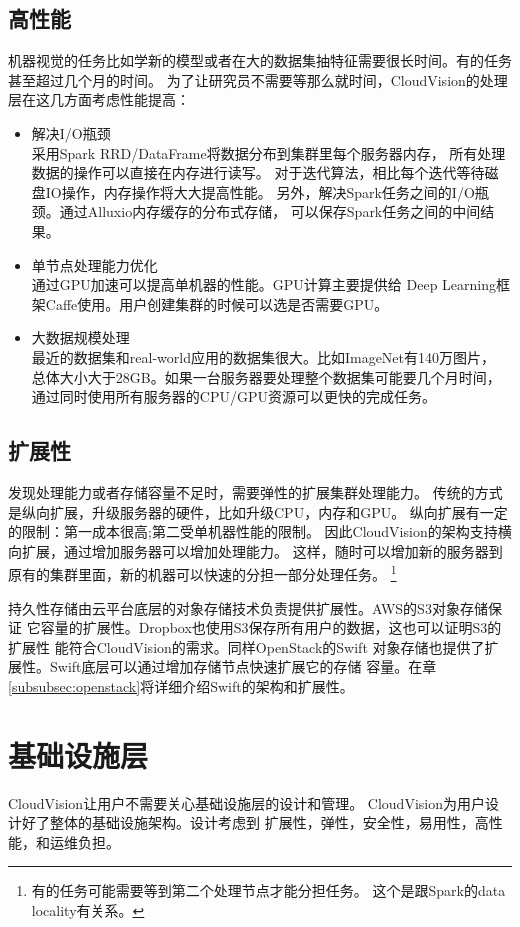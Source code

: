 \subsection{高性能}
机器视觉的任务比如学新的模型或者在大的数据集抽特征需要很长时间。有的任务甚至超过几个月的时间。
为了让研究员不需要等那么就时间，CloudVision的处理层在这几方面考虑性能提高：
\begin{itemize}
  \item 解决I/O瓶颈 \\
        采用Spark RRD/DataFrame将数据分布到集群里每个服务器内存，
        所有处理数据的操作可以直接在内存进行读写。
        对于迭代算法，相比每个迭代等待磁盘IO操作，内存操作将大大提高性能。
        另外，解决Spark任务之间的I/O瓶颈。通过Alluxio内存缓存的分布式存储，
        可以保存Spark任务之间的中间结果。
  \item 单节点处理能力优化 \\
        通过GPU加速可以提高单机器的性能。GPU计算主要提供给
        Deep Learning框架Caffe使用。用户创建集群的时候可以选是否需要GPU。
  \item 大数据规模处理 \\
        最近的数据集和real-world应用的数据集很大。比如ImageNet有140万图片，
        总体大小大于28GB。如果一台服务器要处理整个数据集可能要几个月时间，
        通过同时使用所有服务器的CPU/GPU资源可以更快的完成任务。
\end{itemize}

\subsection{扩展性}
发现处理能力或者存储容量不足时，需要弹性的扩展集群处理能力。
传统的方式是纵向扩展，升级服务器的硬件，比如升级CPU，内存和GPU。
纵向扩展有一定的限制：第一成本很高;第二受单机器性能的限制。
因此CloudVision的架构支持横向扩展，通过增加服务器可以增加处理能力。
这样，随时可以增加新的服务器到原有的集群里面，新的机器可以快速的分担一部分处理任务。
\footnote{有的任务可能需要等到第二个处理节点才能分担任务。
这个是跟Spark的data locality有关系。}

持久性存储由云平台底层的对象存储技术负责提供扩展性。AWS的S3对象存储保证
它容量的扩展性。Dropbox也使用S3保存所有用户的数据，这也可以证明S3的扩展性
能符合CloudVision的需求。同样OpenStack的Swift
对象存储也提供了扩展性。Swift底层可以通过增加存储节点快速扩展它的存储
容量。在章\ref{subsubsec:openstack}将详细介绍Swift的架构和扩展性。

\section{基础设施层}
\label{sec:arch_infra}
CloudVision让用户不需要关心基础设施层的设计和管理。
CloudVision为用户设计好了整体的基础设施架构。设计考虑到
扩展性，弹性，安全性，易用性，高性能，和运维负担。


